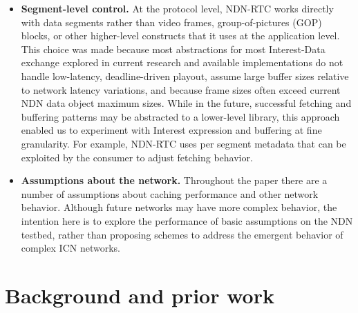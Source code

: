 \documentclass{icn/sig-alternate-2013} %
\newcommand{\ndnrtcName}{NDN-RTC} %
\begin{document}
\begin{itemize} 

\item \textbf{Segment-level control.}  At the protocol level, \ndnrtcName{} works directly with data segments rather than video frames, group-of-pictures (GOP) blocks, or other higher-level constructs that it uses at the application level.  %
This choice was made because most abstractions for most Interest-Data exchange explored in current research and available implementations do not handle low-latency, deadline-driven playout, assume large buffer sizes relative to network latency variations, and because frame sizes often exceed current NDN data object maximum sizes. 
While in the future, successful fetching and buffering patterns may be abstracted to a lower-level library, this approach enabled us to experiment with Interest expression and buffering at fine granularity. For example, \ndnrtcName{} uses per segment metadata that can be exploited by the consumer to adjust fetching behavior. %

\item \textbf{Assumptions about the network.}  Throughout the paper there are a number of assumptions about caching performance and other network behavior. Although future networks may have more complex behavior, the intention here is to explore the performance of basic assumptions on the NDN testbed, rather than proposing schemes to address the emergent behavior of complex ICN networks.

\end{itemize}


\section{Background and prior work}
\label{sec:bg}

\end{document}

